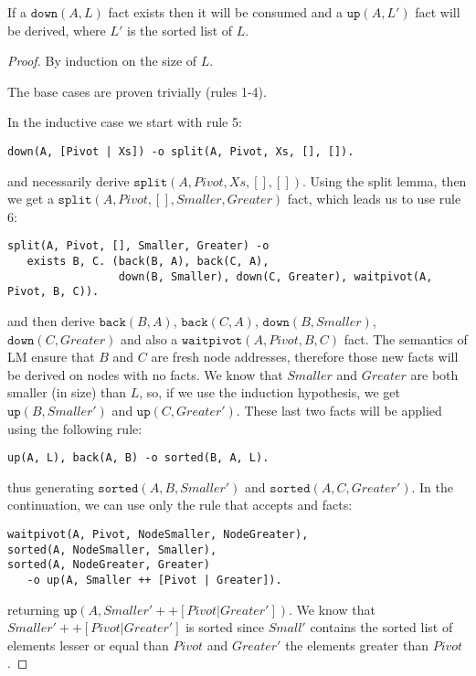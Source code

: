 \begin{theorem}

If a $\mathtt{down}(A, L)$ fact exists then it will be consumed and a
$\mathtt{up}(A, L')$ fact will be derived, where $L'$ is the sorted list of $L$.

\end{theorem}
\begin{proof}
By induction on the size of $L$.

The base cases are proven trivially (rules 1-4).

In the inductive case we start with rule 5:
\begin{Verbatim}[fontsize=\codesize]
down(A, [Pivot | Xs]) -o split(A, Pivot, Xs, [], []).
\end{Verbatim}

and necessarily derive $\mathtt{split}(A, Pivot, Xs, [], [])$. Using the split
lemma, then we get a $\mathtt{split}(A, Pivot, [], Smaller, Greater)$ fact,
which leads us to use rule 6:

\begin{Verbatim}[fontsize=\codesize]
split(A, Pivot, [], Smaller, Greater) -o
   exists B, C. (back(B, A), back(C, A),
                 down(B, Smaller), down(C, Greater), waitpivot(A, Pivot, B, C)).
\end{Verbatim}

and then derive $\mathtt{back}(B, A)$, $\mathtt{back}(C, A)$, $\mathtt{down}(B,
Smaller)$, $\mathtt{down}(C, Greater)$ and also a $\mathtt{waitpivot}(A, Pivot, B, C)$ fact. The semantics of LM ensure that $B$ and $C$ are fresh node
addresses, therefore those new facts will be derived on nodes with no facts. We
know that $Smaller$ and $Greater$ are both smaller (in size) than $L$, so, if we
use the induction hypothesis, we get $\mathtt{up}(B, Smaller')$ and
$\mathtt{up}(C, Greater')$.  These last two facts will be applied using the
following rule:

\begin{Verbatim}[fontsize=\codesize]
up(A, L), back(A, B) -o sorted(B, A, L).
\end{Verbatim}

thus generating $\mathtt{sorted}(A, B, Smaller')$ and $\mathtt{sorted}(A, C,
Greater')$. In the continuation, we can use only the rule that accepts
 and  facts:

\begin{Verbatim}[fontsize=\codesize]
waitpivot(A, Pivot, NodeSmaller, NodeGreater),
sorted(A, NodeSmaller, Smaller),
sorted(A, NodeGreater, Greater)
   -o up(A, Smaller ++ [Pivot | Greater]).
\end{Verbatim}

returning $\mathtt{up}(A, Smaller' ++ [Pivot | Greater'])$.  We know that
$Smaller' ++ [Pivot | Greater']$ is sorted since $Small'$ contains the sorted
list of elements lesser or equal than $Pivot$ and $Greater'$ the elements
greater than $Pivot$.

\end{proof}

